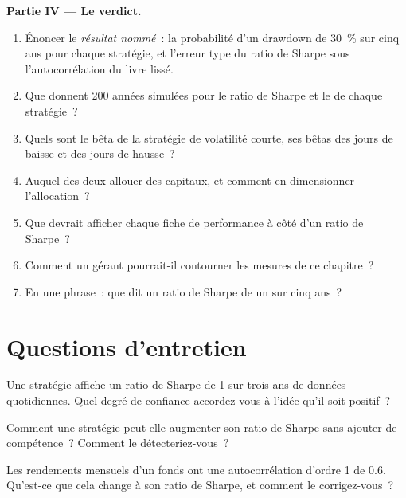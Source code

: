 \begin{problem}
\medskip\noindent\textbf{Partie IV --- Le verdict.}
\begin{enumerate}[resume]
\item Énoncer le \emph{résultat nommé}~: la probabilité d'un drawdown de 30~\% sur cinq ans pour chaque stratégie, et l'erreur type du ratio de Sharpe sous
l'autocorrélation du livre lissé.
\item Que donnent 200 années simulées pour le ratio de Sharpe et le  de chaque stratégie~?
\item Quels sont le bêta de la stratégie de volatilité courte, ses bêtas des jours de baisse et des jours de hausse~?
\item Auquel des deux allouer des capitaux, et comment en dimensionner l'allocation~?
\item Que devrait afficher chaque fiche de performance à côté d'un ratio de Sharpe~?
\item Comment un gérant pourrait-il contourner les mesures de ce chapitre~?
\item En une phrase~: que dit un ratio de Sharpe de un sur cinq ans~?
\end{enumerate}
\end{problem}

\section{Questions d'entretien}

\begin{interviewq}\label{iq:rs:performance-measurement:1}
Une stratégie affiche un ratio de Sharpe de 1 sur trois ans de données quotidiennes. Quel degré de confiance accordez-vous à l'idée qu'il soit positif~?
\end{interviewq}

\begin{interviewq}\label{iq:rs:performance-measurement:2}
Comment une stratégie peut-elle augmenter son ratio de Sharpe sans ajouter de compétence~? Comment le détecteriez-vous~?
\end{interviewq}

\begin{interviewq}\label{iq:rs:performance-measurement:3}
Les rendements mensuels d'un fonds ont une autocorrélation d'ordre 1 de 0.6. Qu'est-ce que cela change à son ratio de Sharpe, et comment le corrigez-vous~?
\end{interviewq}

